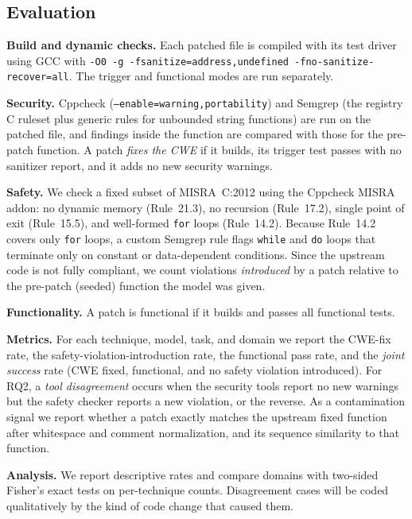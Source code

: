 \documentclass[12pt]{IEEEtran}
\begin{document}
\subsection{Evaluation}
\textbf{Build and dynamic checks.} Each patched file is compiled with its test driver using GCC with \texttt{-O0 -g -fsanitize=address,undefined -fno-sanitize-recover=all}. The trigger and functional modes are run separately.

\textbf{Security.} Cppcheck (\texttt{--enable=warning,portability}) and Semgrep (the registry C ruleset plus generic rules for unbounded string functions) are run on the patched file, and findings inside the function are compared with those for the pre-patch function. A patch \emph{fixes the CWE} if it builds, its trigger test passes with no sanitizer report, and it adds no new security warnings.

\textbf{Safety.} We check a fixed subset of MISRA~C:2012 using the Cppcheck MISRA addon: no dynamic memory (Rule~21.3), no recursion (Rule~17.2), single point of exit (Rule~15.5), and well-formed \texttt{for} loops (Rule~14.2). Because Rule~14.2 covers only \texttt{for} loops, a custom Semgrep rule flags \texttt{while} and \texttt{do} loops that terminate only on constant or data-dependent conditions. Since the upstream code is not fully compliant, we count violations \emph{introduced} by a patch relative to the pre-patch (seeded) function the model was given.

\textbf{Functionality.} A patch is functional if it builds and passes all functional tests.

\textbf{Metrics.} For each technique, model, task, and domain we report the CWE-fix rate, the safety-violation-introduction rate, the functional pass rate, and the \emph{joint success} rate (CWE fixed, functional, and no safety violation introduced). For RQ2, a \emph{tool disagreement} occurs when the security tools report no new warnings but the safety checker reports a new violation, or the reverse. As a contamination signal we report whether a patch exactly matches the upstream fixed function after whitespace and comment normalization, and its sequence similarity to that function.

\textbf{Analysis.} We report descriptive rates and compare domains with two-sided Fisher's exact tests on per-technique counts. Disagreement cases will be coded qualitatively by the kind of code change that caused them.
\end{document}
